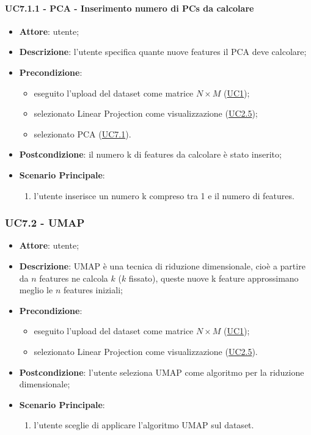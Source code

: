     \paragraph{UC7.1.1 - PCA - Inserimento numero di PCs da calcolare}
    \label{uc7.1.1}
    \begin{itemize}
    \item \textbf{Attore}: utente;
    \item \textbf{Descrizione}: l'utente specifica quante nuove features il PCA deve calcolare;
    \item \textbf{Precondizione}: 
    \begin{itemize}
        \item eseguito l'upload del dataset come matrice $N\times M$ (\hyperref[uc1]{UC1});
        \item selezionato Linear Projection come visualizzazione (\hyperref[uc2.5]{UC2.5});
        \item selezionato PCA (\hyperref[uc7.1]{UC7.1}).
    \end{itemize}  
    \item \textbf{Postcondizione}: il numero k di features da calcolare è stato inserito;
    \item \textbf{Scenario Principale}: 
    \begin{enumerate}
        \item l'utente inserisce un numero k compreso tra 1 e il numero di features.
    \end{enumerate}  
    \end{itemize}
    
    \subsubsection{UC7.2 - UMAP}
    \label{uc7.2}
    \begin{itemize}
    \item \textbf{Attore}: utente;
    \item \textbf{Descrizione}: UMAP è una tecnica di riduzione dimensionale, cioè a partire da $n$ features ne calcola $k$ ($k$ fissato), queste nuove k feature approssimano meglio le $n$ features iniziali;
    \item \textbf{Precondizione}: 
    \begin{itemize}
        \item eseguito l'upload del dataset come matrice $N\times M$ (\hyperref[uc1]{UC1});
        \item selezionato Linear Projection come visualizzazione (\hyperref[uc2.5]{UC2.5}).
    \end{itemize}  
    \item \textbf{Postcondizione}: l'utente seleziona UMAP come algoritmo per la riduzione dimensionale;
    \item \textbf{Scenario Principale}: 
    \begin{enumerate}
        \item l'utente sceglie di applicare l'algoritmo UMAP sul dataset.
    \end{enumerate}
    \end{itemize}
    
